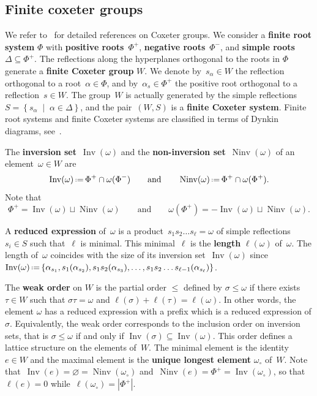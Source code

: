 \documentclass[reqno]{amsart}
\theoremstyle{definition}
\newcommand{\set}[2]{\left\{ #1 \;\middle|\; #2 \right\}} %
\newcommand{\eqdef}{\mbox{\,\raisebox{0.2ex}{\scriptsize\ensuremath{\mathrm:}}\ensuremath{=}\,}} %
\DeclareMathOperator{\Inv}{Inv} %
\DeclareMathOperator{\Ninv}{Ninv} %
\newcommand{\defn}[1]{\textbf{\textsf{\color{PineGreen} #1}}} %
\newcommand{\wo}{\omega_\circ} %
\begin{document}

\subsection{Finite coxeter groups} 
\label{subsec:finiteCoxeterGroups}

We refer to~\cite{BjornerBrenti, Humphreys} for detailed references on Coxeter groups. 
We consider a \defn{finite root system} $\Phi$ with \defn{positive roots}~$\Phi^+$, \defn{negative roots}~$\Phi^-$, and \defn{simple roots} $\Delta \subseteq \Phi^+$.
The reflections along the hyperplanes orthogonal to the roots in $\Phi$ generate a \defn{finite Coxeter group} $W$.
We denote by~$s_\alpha \in W$ the reflection orthogonal to a root~$\alpha \in \Phi$, and by~$\alpha_s \in \Phi^+$ the positive root orthogonal to a reflection~$s \in W$.
The group~$W$ is actually generated by the simple reflections~$S = \set{s_\alpha}{\alpha \in \Delta}$, and the pair~$(W,S)$ is a \defn{finite Coxeter system}.
Finite root systems and finite Coxeter systems are classified in terms of Dynkin diagrams, see~\cite{Humphreys}. 

The \defn{inversion set}~$\Inv(\omega)$ and the \defn{non-inversion set}~$\Ninv(\omega)$ of an element~$\omega \in W$ are
\[
\Inv(\omega) \eqdef \Phi^+ \cap \omega(\Phi^-)
\qquad\text{and}\qquad
\Ninv(\omega) \eqdef \Phi^+ \cap \omega(\Phi^+).
\]
Note that
\[
\Phi^+ = \Inv(\omega) \sqcup \Ninv(\omega)
\qquad\text{and}\qquad
\omega(\Phi^+) = -\Inv(\omega) \sqcup \Ninv(\omega).
\]

A \defn{reduced expression} of~$\omega$ is a product~$s_1 s_2 \dots s_\ell = \omega$ of simple reflections~$s_i \in S$ such that~$\ell$ is minimal.
This minimal~$\ell$ is the \defn{length} $\ell(\omega)$ of~$\omega$.
The length of~$\omega$ coincides with the size of its inversion set~$\Inv(\omega)$ since $\Inv(\omega) \eqdef \{\alpha_{s_1}, s_1(\alpha_{s_2}), s_1s_2(\alpha_{s_3}), \dots, s_1s_2 \dots s_{\ell-1}(\alpha_{s_\ell})\}$.

The \defn{weak order} on $W$ is the partial order $\le$ defined by $\sigma \leq \omega$ if there exists $\tau \in W$  such that $\sigma\tau = \omega$ and $\ell(\sigma) + \ell(\tau) = \ell(\omega)$.
In other words, the element $\omega$ has a reduced expression with a prefix which is a reduced expression of $\sigma$.
Equivalently, the weak order corresponds to the inclusion order on inversion sets, that is $\sigma \leq \omega$ if and only if $\Inv(\sigma) \subseteq \Inv(\omega)$.
This order defines a lattice structure on the elements of~$W$.
The minimal element is the identity $e \in W$ and the maximal element is the \defn{unique longest element} $\wo$ of~$W$.
Note that~$\Inv(e) = \varnothing = \Ninv(\wo)$ and~$\Ninv(e) = \Phi^+ = \Inv(\wo)$, so that~$\ell(e) = 0$ while~$\ell(\wo) = |\Phi^+|$.
\end{document}
